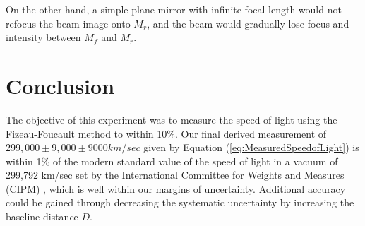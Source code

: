 \documentclass[twocolumn]{article}
\begin{document}
		On the other hand, a simple plane mirror with infinite focal length would not refocus the beam image onto $M_r$, and the beam would gradually lose focus and intensity between $M_f$ and $M_r$.
\section{Conclusion}
	\label{sec:Conclusion}
	The objective of this experiment was to measure the speed of light using the Fizeau-Foucault method to within 10\%.
	Our final derived measurement of $299,000 \pm 9,000 \pm 9000 km/sec$ given by Equation (\ref{eq:MeasuredSpeedofLight}) is within 1\% of the modern standard value of the speed of light in a vacuum of 299,792 km/sec set by the International Committee for Weights and Measures (CIPM) \cite{_bipm_1984}, which is well within our margins of uncertainty.
	Additional accuracy could be gained through decreasing the systematic uncertainty by increasing the baseline distance $D$.
	


\end{document}
